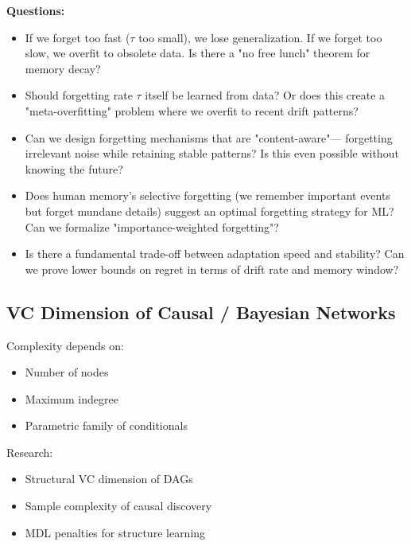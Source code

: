   \textbf{Questions:}
  \begin{itemize}
    \item If we forget too fast ($\tau$ too small), we lose
      generalization. If we forget too slow, we overfit to obsolete data.
      Is there a "no free lunch" theorem for memory decay?

    \item Should forgetting rate $\tau$ itself be learned from data? Or
      does this create a "meta-overfitting" problem where we overfit to
      recent drift patterns?

    \item Can we design forgetting mechanisms that are "content-aware"—
      forgetting irrelevant noise while retaining stable patterns? Is this
      even possible without knowing the future?

    \item Does human memory's selective forgetting (we remember
      important events but forget mundane details) suggest an optimal forgetting
      strategy for ML? Can we formalize "importance-weighted forgetting"?

    \item Is there a fundamental trade-off between adaptation speed and stability?
      Can we prove lower bounds on regret in terms of drift rate and
      memory window?
  \end{itemize}

  \subsection*{VC Dimension of Causal / Bayesian Networks}

  Complexity depends on:
  \begin{itemize}
    \item Number of nodes

    \item Maximum indegree

    \item Parametric family of conditionals
  \end{itemize}

  Research:
  \begin{itemize}
    \item Structural VC dimension of DAGs

    \item Sample complexity of causal discovery

    \item MDL penalties for structure learning
  \end{itemize}

